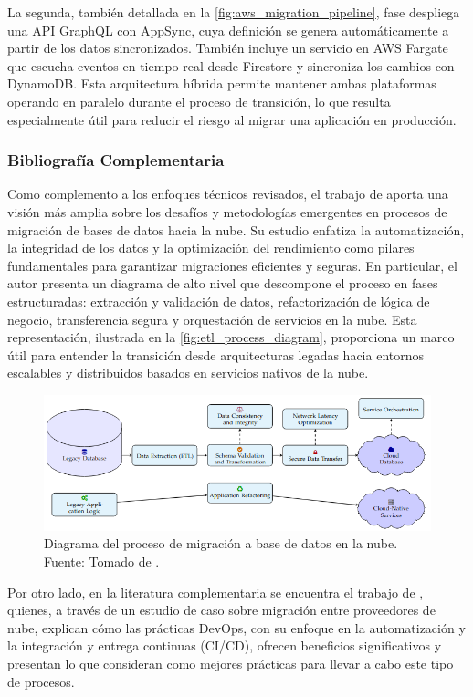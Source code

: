 La segunda, también detallada en la \autoref{fig:aws_migration_pipeline}, fase despliega una API GraphQL con AppSync, cuya definición se genera automáticamente a partir de los datos sincronizados. También incluye un servicio en AWS Fargate que escucha eventos en tiempo real desde Firestore y sincroniza los cambios con DynamoDB. Esta arquitectura híbrida permite mantener ambas plataformas operando en paralelo durante el proceso de transición, lo que resulta especialmente útil para reducir el riesgo al migrar una aplicación en producción.

\subsubsection{Bibliografía Complementaria}
Como complemento a los enfoques técnicos revisados, el trabajo de \textcite{Kansara2024} aporta una visión más amplia sobre los desafíos y metodologías emergentes en procesos de migración de bases de datos hacia la nube. Su estudio enfatiza la automatización, la integridad de los datos y la optimización del rendimiento como pilares fundamentales para garantizar migraciones eficientes y seguras. En particular, el autor presenta un diagrama de alto nivel que descompone el proceso en fases estructuradas: extracción y validación de datos, refactorización de lógica de negocio, transferencia segura y orquestación de servicios en la nube. Esta representación, ilustrada en la \autoref{fig:etl_process_diagram}, proporciona un marco útil para entender la transición desde arquitecturas legadas hacia entornos escalables y distribuidos basados en servicios nativos de la nube.

\newcommand\migrationProcessDiagramCaption{Diagrama del proceso de migración a base de datos en la nube. \hspace{1em}}
\begin{figure}[H]
\centering
\includegraphics[width=1\textwidth]{img/figures/fig6-etl-process.png}
\caption[\migrationProcessDiagramCaption]{\migrationProcessDiagramCaption Fuente: Tomado de \cite{Kansara2024}.}
\label{fig:etl_process_diagram}
\end{figure}

Por otro lado, en la literatura complementaria se encuentra el trabajo de \textcite{Kyadasu2025}, quienes, a través de un estudio de caso sobre migración entre proveedores de nube, explican cómo las prácticas DevOps, con su enfoque en la automatización y la integración y entrega continuas (CI/CD), ofrecen beneficios significativos y presentan lo que consideran como mejores prácticas para llevar a cabo este tipo de procesos.
